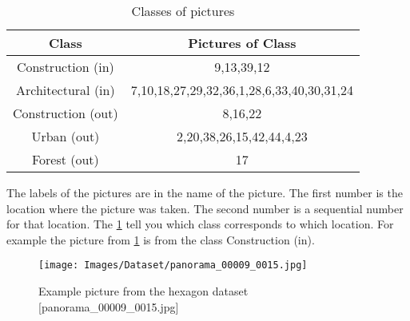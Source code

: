 \begin{table}[htbp]
    \centering
    \begin{tabular}{cc}
    \toprule
    \textbf{Class}& \textbf{Pictures of Class}\\ \midrule
    Construction (in) & 9,13,39,12 \\ \hline
    Architectural (in)& 7,10,18,27,29,32,36,1,28,6,33,40,30,31,24\\ \hline
    Construction (out)& 8,16,22\\ \hline
    Urban (out)& 2,20,38,26,15,42,44,4,23\\ \hline
    Forest (out)& 17\\
    \bottomrule
    \end{tabular}
    \caption{Classes of pictures
        \label{tab:dataset:piccoding}}
\end{table}

The labels of the pictures are in the name of the picture.
The first number is the location where the picture was taken.
The second number is a sequential number for that location.
The \cref{tab:dataset:piccoding} tell you which class corresponds to which location.
For example the picture from \cref{fig:dataset:examplepic} is from the class Construction (in).

\begin{figure}
    \centering
    \texttt{[image: Images/Dataset/panorama\_00009\_0015.jpg]}
    \caption{Example picture from the hexagon dataset [panorama\_00009\_0015.jpg]}
    \label{fig:dataset:examplepic}
\end{figure}